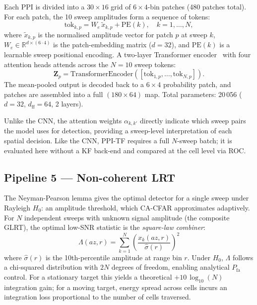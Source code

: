 \documentclass[conference]{IEEEtran}
\begin{document}
Each PPI is divided into a $30 \times 16$ grid of $6 \times 4$-bin patches
(480 patches total).
For each patch, the 10 sweep amplitudes form a sequence of tokens:
\begin{equation}
  \mathrm{tok}_{k,p} = W_e\,\tilde{x}_{k,p} + \mathrm{PE}(k),
  \quad k = 1, \ldots, N,
  \label{eq:tf_tok}
\end{equation}
where $\tilde{x}_{k,p}$ is the normalised amplitude vector for patch $p$ at sweep $k$,
$W_e \in \mathbb{R}^{d \times (6 \cdot 4)}$ is the patch-embedding matrix ($d=32$),
and $\mathrm{PE}(k)$ is a learnable sweep positional encoding.
A two-layer Transformer encoder~\cite{Vaswani2017} with four attention heads
attends across the $N=10$ sweep tokens:
\begin{equation}
  \mathbf{Z}_p = \mathrm{TransformerEncoder}\!\left([\mathrm{tok}_{1,p}, \ldots, \mathrm{tok}_{N,p}]\right).
  \label{eq:tf_enc}
\end{equation}
The mean-pooled output is decoded back to a $6 \times 4$ probability patch,
and patches are assembled into a full $(180 \times 64)$ map.
Total parameters: 20\,056 ($d=32$, $d_\mathrm{ff}=64$, 2 layers).

Unlike the CNN, the attention weights $\alpha_{k,k'}$ directly indicate
which sweep pairs the model uses for detection, providing a sweep-level
interpretation of each spatial decision.
Like the CNN, PPI-TF requires a full $N$-sweep batch; it is evaluated
here without a KF back-end and compared at the cell level via ROC.

\subsection{Pipeline 5 --- Non-coherent LRT}

The Neyman-Pearson lemma gives the optimal detector for a single sweep
under Rayleigh $H_0$: an amplitude threshold, which CA-CFAR approximates
adaptively.
For $N$ independent sweeps with unknown signal amplitude (the composite
GLRT), the optimal low-SNR statistic is the \emph{square-law combiner}:
\begin{equation}
  \Lambda(az,r) = \sum_{k=1}^{N}
    \left(\frac{x_k(az,r)}{\hat{\sigma}(r)}\right)^{\!2}
  \label{eq:lrt}
\end{equation}
where $\hat{\sigma}(r)$ is the 10th-percentile amplitude at range bin $r$.
Under $H_0$, $\Lambda$ follows a chi-squared distribution with $2N$
degrees of freedom, enabling analytical $P_\mathrm{fa}$ control.
For a stationary target this yields a theoretical $+10\,\log_{10}(N)$
integration gain; for a moving target, energy spread across cells incurs
an integration loss proportional to the number of cells traversed.
\end{document}
